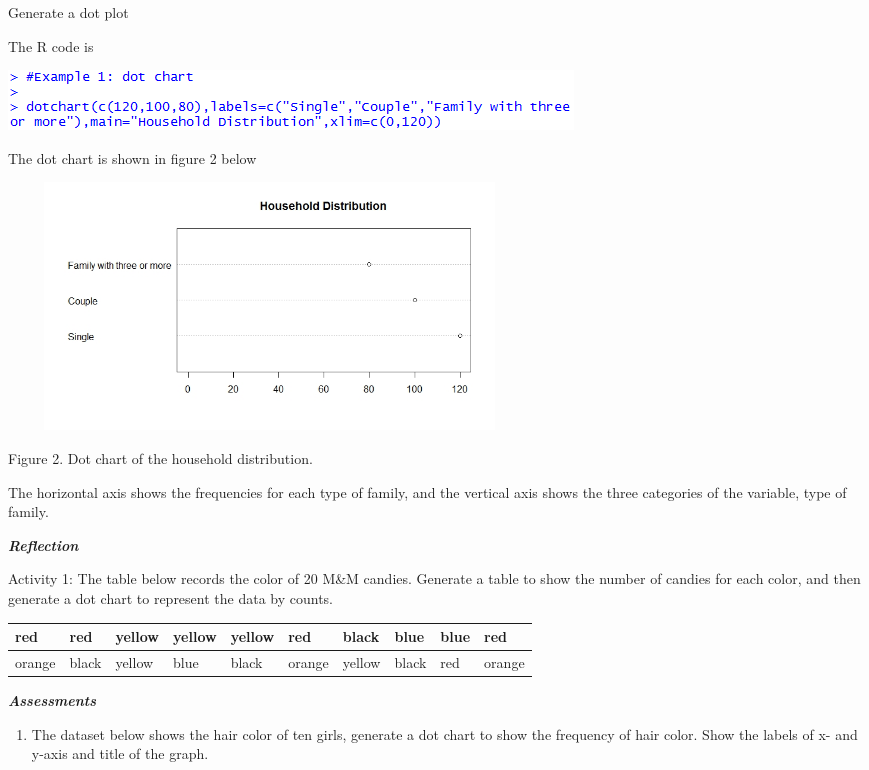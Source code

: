 Generate a dot plot

The R code is

\includegraphics[width=5.89583in,height=0.625in]{media/image2.png}

The dot chart is shown in figure 2 below

\includegraphics[width=5.45347in,height=2.58333in]{media/image3.jpeg}

Figure 2. Dot chart of the household distribution.

The horizontal axis shows the frequencies for each type of family, and
the vertical axis shows the three categories of the variable, type of
family.

\emph{\textbf{Reflection}}

Activity 1: The table below records the color of 20 M\&M candies.
Generate a table to show the number of candies for each color, and then
generate a dot chart to represent the data by counts.

\begin{longtable}[]{@{}llllllllll@{}}
\toprule
red & red & yellow & yellow & yellow & red & black & blue & blue &
red\tabularnewline
\midrule
\endhead
orange & black & yellow & blue & black & orange & yellow & black & red &
orange\tabularnewline
\bottomrule
\end{longtable}

\emph{\textbf{Assessments}}

\begin{enumerate}
\def\labelenumi{\arabic{enumi}.}
\item
  The dataset below shows the hair color of ten girls, generate a dot
  chart to show the frequency of hair color. Show the labels of x- and
  y-axis and title of the graph.
\end{enumerate}

